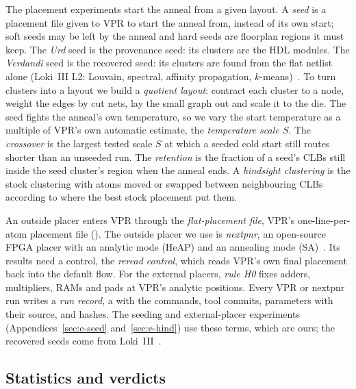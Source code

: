 The placement experiments start the anneal from a given layout. A \emph{seed} is a placement file given to VPR to start the anneal from, instead of its own start; soft seeds may be left by the anneal and hard seeds are floorplan regions it must keep. %
The \emph{Urd} seed is the provenance seed: its clusters are the HDL modules. %
The \emph{Verdandi} seed is the recovered seed: its clusters are found from the flat netlist alone (Loki~III L2: Louvain, spectral, affinity propagation, $k$-means)~\cite{loki3}. %
To turn clusters into a layout we build a \emph{quotient layout}: contract each cluster to a node, weight the edges by cut nets, lay the small graph out and scale it to the die. %
The seed fights the anneal's own temperature, so we vary the start temperature as a multiple of VPR's own automatic estimate, the \emph{temperature scale $S$}. %
The \emph{crossover} is the largest tested scale $S$ at which a seeded cold start still routes shorter than an unseeded run. %
The \emph{retention} is the fraction of a seed's CLBs still inside the seed cluster's region when the anneal ends. %
A \emph{hindsight clustering} is the stock clustering with atoms moved or swapped between neighbouring CLBs according to where the best stock placement put them. %

An outside placer enters VPR through the \emph{flat-placement file}, VPR's one-line-per-atom placement file (). %
The outside placer we use is \emph{nextpnr}, an open-source FPGA placer with an analytic mode (HeAP) and an annealing mode (SA)~\cite{gort2012heap,shah2019nextpnr}. %
Its results need a control, the \emph{reread control}, which reads VPR's own final placement back into the default flow. %
For the external placers, \emph{rule H0} fixes adders, multipliers, RAMs and pads at VPR's analytic positions. %
Every VPR or nextpnr run writes a \emph{run record}, a  with the commands, tool commits, parameters with their source, and hashes. %
The seeding and external-placer experiments (Appendices~\ref{sec:e-seed} and~\ref{sec:e-hind}) use these terms, which are ours; the recovered seeds come from Loki~III~\cite{loki3}.

\subsection{Statistics and verdicts}

